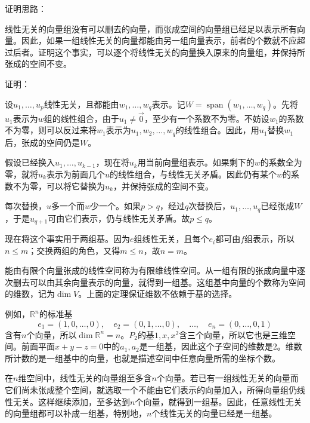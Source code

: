 {\heiti{}证明思路：}
\nopagebreak[4]

线性无关的向量组没有可以删去的向量，而张成空间的向量组已经足以表示所有向量。因此，如果一组线性无关的向量都能由另一组向量表示，前者的个数就不应超过后者。证明这个事实，可以逐个将线性无关的向量换入原来的向量组，并保持所张成的空间不变。

{\heiti{}证明：}
\nopagebreak[4]

设\(u_{1} , \ldots , u_{p}\)线性无关，且都能由\(w_{1} , \ldots , w_{q}\)表示。记\(W = \operatorname{span}\left( w_{1} , \ldots , w_{q} \right)\)。先将\(u_{1}\)表示为\(w\)组的线性组合，由于\(u_{1} \ne \vec{0}\)，至少有一个系数不为零。不妨设\(w_{1}\)的系数不为零，则可以反过来将\(w_{1}\)表示为\(u_{1} , w_{2} , \ldots , w_{q}\)的线性组合。因此，用\(u_{1}\)替换\(w_{1}\)后，张成的空间仍是\(W\)。

假设已经换入\(u_{1} , \ldots , u_{k - 1}\)，现在将\(u_{k}\)用当前向量组表示。如果剩下的\(w\)的系数全为零，就将\(u_{k}\)表示为前面几个\(u\)的线性组合，与线性无关矛盾。因此仍有某个\(w\)的系数不为零，可以将它替换为\(u_{k}\)，并保持张成的空间不变。

每次替换，\(u\)多一个而\(w\)少一个。如果\(p > q\)，经过\(q\)次替换后，\(u_{1} , \ldots , u_{q}\)已经张成\(W\)，于是\(u_{q + 1}\)可由它们表示，仍与线性无关矛盾。故\(p \le q\)。

现在将这个事实用于两组基。因为\(e\)组线性无关，且每个\(e_{i}\)都可由\(f\)组表示，所以\(n \le m\)；交换两组的角色，又得\(m \le n\)，故\(n = m\)。

能由有限个向量张成的线性空间称为{\heiti{}有限维线性空间}。从一组有限的张成向量中逐次删去可以由其余向量表示的向量，就得到一组基。这组基中向量的个数称为空间的{\heiti{}维数}，记为\(\dim V\)。上面的定理保证维数不依赖于基的选择。

例如，\(\mathbb{R}^{n}\)的标准基
\begin{equation}
    e_{1} = \left( 1 , 0 , \ldots , 0 \right) , \quad
    e_{2} = \left( 0 , 1 , \ldots , 0 \right) , \quad \ldots , \quad
    e_{n} = \left( 0 , \ldots , 0 , 1 \right)
\end{equation}
含有\(n\)个向量，所以\(\dim \mathbb{R}^{n} = n\)。\(P_{2}\)的基\(1 , x , x^{2}\)含三个向量，所以它也是三维空间。前面平面\(x + y - z = 0\)中的\(a_{1} , a_{2}\)是一组基，因此这个子空间的维数是\(2\)。维数所计数的是一组基中的向量，也就是描述空间中任意向量所需的坐标个数。

在\(n\)维空间中，线性无关的向量组至多含\(n\)个向量。若已有一组线性无关的向量而它们尚未张成整个空间，就选取一个不能由它们表示的向量加入，所得向量组仍线性无关。这样继续添加，至多达到\(n\)个向量，就得到一组基。因此，任意线性无关的向量组都可以补成一组基，特别地，\(n\)个线性无关的向量已经是一组基。

